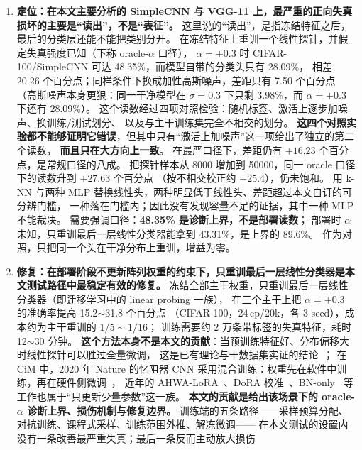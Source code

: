 \documentclass[11pt,a4paper]{ctexart}
\begin{document}
\begin{enumerate}[leftmargin=2em,itemsep=2pt]
  \item \textbf{定位：在本文主要分析的 SimpleCNN 与 VGG-11 上，最严重的正向失真损坏的主要是“读出”，不是“表征”。}
        这里说的“读出”，是指冻结特征之后，最后的分类层还能不能把类别分开。
        在冻结特征上重训一个线性探针，并假定失真强度已知（下称 oracle-$\alpha$ 口径），
        $\alpha=+0.3$ 时 CIFAR-100/SimpleCNN 可达 48.35\%，而模型自带的分类头只有 28.09\%，
        相差 20.26 个百分点；同样条件下换成加性高斯噪声，差距只有 7.50 个百分点
        （高斯噪声本身更狠：同一干净模型在 $\sigma=0.3$ 下只剩 3.98\%，而 $\alpha=+0.3$ 下还有 28.09\%）。
        这个读数经过四项对照检验：随机标签、激活上逐步加噪声、换训练/测试划分、
        以及与主干训练集完全不相交的划分。
        \textbf{这四个对照实验都不能够证明它错误}，但其中只有“激活上加噪声”这一项给出了独立的第二个读数，
        \textbf{而且只在大方向上一致}。
        在最严口径下，差距仍有 $+16.23$ 个百分点，是常规口径的八成。
        把探针样本从 8000 增加到 50000，同一 oracle 口径下的读数升到 $+27.63$ 个百分点
        （按不相交校正约 $+25.4$），仍未饱和。
        用 k-NN 与两种 MLP 替换线性头，两种明显低于线性头、差距超过本文自订的可分辨门槛，
        一种落在门槛内；因此没有发现容量不足的证据，其中一种 MLP 不能裁决。
        需要强调口径：\textbf{48.35\% 是诊断上界，不是部署读数}；
        部署时 $\alpha$ 未知，只重训最后一层线性分类器能拿到 43.31\%，是上界的 89.6\%。
        作为对照，只把同一个头在干净分布上重训，增益为零。
  \item \textbf{修复：在部署阶段不更新阵列权重的约束下，只重训最后一层线性分类器是本文测试路径中最稳定有效的修复。}
        冻结全部主干权重，只重训最后一层线性分类器（即迁移学习中的 linear probing 一族），
        在三个主干上把 $\alpha=+0.3$ 的准确率提高 15.2$\sim$31.8 个百分点
        （CIFAR-100，24\,ep/20k，各 3 seed），成本约为主干重训的 $1/5\sim1/16$；
        训练需要约 2 万条带标签的失真特征，耗时 12$\sim$30 分钟。
        \textbf{这个方法本身不是本文的贡献}：当预训练特征好、分布偏移大时线性探针可以胜过全量微调，
        这是已有理论与十数据集实证的结论~\cite{lpft}；
        在 CiM 中，2020 年 Nature 的忆阻器 CNN 采用混合训练：权重先在软件中训练，再在硬件侧微调~\cite{yao2020}，
        近年的 AHWA-LoRA~\cite{ahwa_lora}、DoRA 校准~\cite{dora}、BN-only~\cite{bn_only} 等工作也属于“只更新少量参数”这一族。
        \textbf{本文的贡献是给出该场景下的 oracle-$\alpha$ 诊断上界、损伤机制与修复边界。}
        训练端的五条路径——采样预算分配、对抗训练、课程式采样、训练范围外推、解冻微调——
        在本文测试的设置内没有一条改善最严重失真；最后一条反而主动放大损伤

\end{enumerate}
\end{document}
